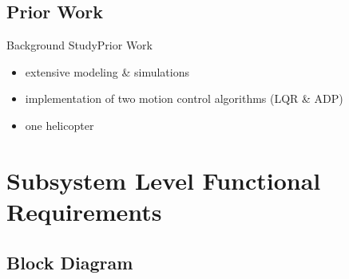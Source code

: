 \documentclass{beamer}
\begin{document}
\subsection{Prior Work}

\begin{frame}{Background Study}{Prior Work} %
  \begin{itemize}
      \item extensive modeling \& simulations
      \item implementation of two motion control algorithms (LQR \& ADP)
      \item one helicopter
  \end{itemize}
\end{frame}



  


\section{Subsystem Level Functional Requirements}



\subsection{Block Diagram}
\end{document}
